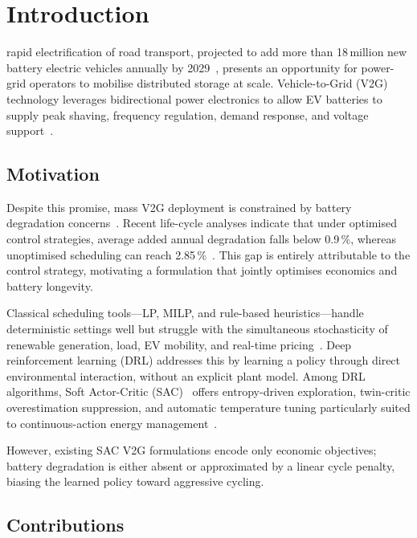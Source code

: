 \documentclass[journal,10pt,twocolumn]{IEEEtran}
\begin{document}
\section{Introduction}\label{sec:intro}

 rapid electrification of road transport,
projected to add more than 18\,million new battery electric vehicles
annually by 2029~\cite{iea_ev_2024}, presents an opportunity for
power-grid operators to mobilise distributed storage at scale.
Vehicle-to-Grid (V2G) technology leverages bidirectional power
electronics to allow EV batteries to supply peak shaving, frequency
regulation, demand response, and voltage support~\cite{kempton_v2g_2005,kempton_udel_v2g}.

\subsection{Motivation}

Despite this promise, mass V2G deployment is constrained by battery
degradation concerns~\cite{v2g_barriers_2026}.
Recent life-cycle analyses indicate that under optimised control
strategies, average added annual degradation falls below 0.9\,\%,
whereas unoptimised scheduling can reach 2.85\,\%~\cite{gao_economics_2025}.
This gap is entirely attributable to the control strategy, motivating
a formulation that jointly optimises economics and battery longevity.

Classical scheduling tools---LP, MILP, and rule-based heuristics---handle
deterministic settings well but struggle with the simultaneous
stochasticity of renewable generation, load, EV mobility, and real-time
pricing~\cite{liu_v2g_review_2026}.
Deep reinforcement learning (DRL) addresses this by learning a policy
through direct environmental interaction, without an explicit plant model.
Among DRL algorithms, Soft Actor-Critic (SAC)~\cite{haarnoja_sac_2018}
offers entropy-driven exploration, twin-critic overestimation
suppression, and automatic temperature tuning particularly suited to
continuous-action energy management~\cite{wang_sac_mg_2025}.

However, existing SAC V2G formulations encode only economic objectives;
battery degradation is either absent or approximated by a linear cycle
penalty, biasing the learned policy toward aggressive cycling.

\subsection{Contributions}
\end{document}
